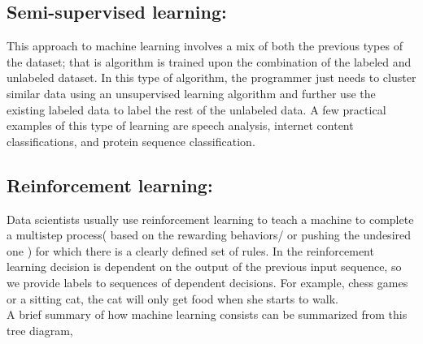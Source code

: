 \subsection{Semi-supervised learning:}
This approach to machine learning involves a mix of both the previous types of the dataset; that is algorithm is trained upon the combination of the labeled and unlabeled dataset.  In this type of algorithm, the programmer just needs to cluster similar data using an unsupervised learning algorithm and further use the existing labeled data to label the rest of the unlabeled data. A few practical examples of this type of learning are speech analysis, internet content classifications, and protein sequence classification\cite{Shental05semi-supervisedlearning}.


\subsection{Reinforcement learning: }
Data scientists usually use reinforcement learning to teach a machine to complete a multistep process( based on the rewarding behaviors/ or pushing the undesired one ) for which there is a clearly defined set of rules. In the reinforcement learning decision is dependent on the output of the previous input sequence, so we provide labels to sequences of dependent decisions. For example, chess games or a sitting cat, the cat will only get food when she starts to walk\cite{Thrun92efficientexploration}.\\

A brief summary of how machine learning consists can be summarized from this tree diagram,
%

